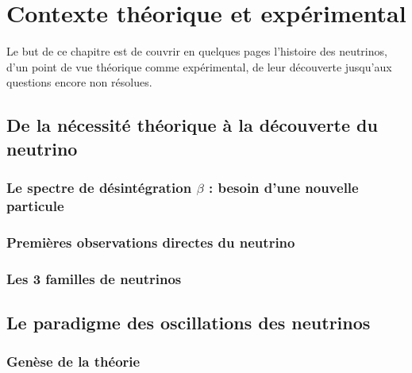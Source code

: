 \chapter{Contexte théorique et expérimental}
    
    Le but de ce chapitre est de couvrir en quelques pages l'histoire des neutrinos, d'un point de vue théorique comme expérimental, de leur découverte jusqu'aux questions encore non résolues.
    
    \section{De la nécessité théorique à la découverte du neutrino}
    
        \subsection{Le spectre de désintégration \texorpdfstring{$\beta$}{b} : besoin d'une nouvelle particule}
    
        \subsection{Premières observations directes du neutrino}
    
        \subsection{Les 3 familles de neutrinos}
    
    \section{Le paradigme des oscillations des neutrinos}
    
        \subsection{Genèse de la théorie}
        
